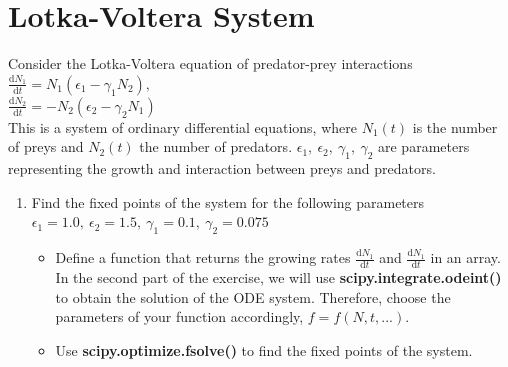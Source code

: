 \documentclass[smallheadings,12pt]{scrartcl}
\begin{document}
\section{Lotka-Voltera System}
Consider the Lotka-Voltera equation of predator-prey interactions\\[0.5em]
$\frac{\mathrm{d}N_1}{\mathrm{d}t} = N_1(\epsilon_1 - \gamma_1 N_2),$\\
$\frac{\mathrm{d}N_2}{\mathrm{d}t} = -N_2(\epsilon_2 - \gamma_2 N_1)$\\[0.5em]
This is a system of ordinary differential equations, where $N_1(t)$ is the number of preys and $N_2(t)$ the number of predators.
$\epsilon_1,\:\epsilon_2,\:\gamma_1,\:\gamma_2$ are parameters representing the growth and interaction between preys and predators.
\begin{enumerate}
  \item Find the fixed points of the system for the following parameters\\
$\epsilon_1 = 1.0,\:\epsilon_2 = 1.5,\:\gamma_1 = 0.1,\:\gamma_2 = 0.075$
    \begin{itemize}
      \item Define a function that returns the growing rates $\frac{\mathrm{d}N_1}{\mathrm{d}t}$ and $\frac{\mathrm{d}N_1}{\mathrm{d}t}$ in an array. In the second part of the exercise, we will use \textbf{scipy.integrate.odeint()} to obtain the solution of the ODE system. Therefore,  choose the parameters of your function accordingly, $f = f(N, t, ...)$.
      \item Use \textbf{scipy.optimize.fsolve()} to find the fixed points of the system.
    \end{itemize}


\end{enumerate}
\end{document}

